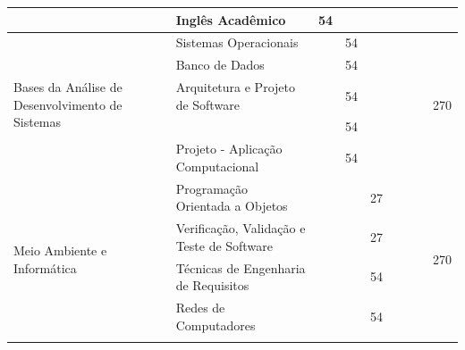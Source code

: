 \documentclass[11pt,fleqn]{book} %
\begin{document}
\begin{table}[]
{\begin{tabular}{|l|l|c|c|c|c|c|c|c|}
			& Inglês Acadêmico                                              & 54              &                 &                 &                 &                 &                 &                      \\ \hline
			\multirow{5}{*}{Bases da Análise de Desenvolvimento de Sistemas} 
			& Sistemas Operacionais                                         &                 & 54              &                 &                 &                 &                 & \multirow{5}{*}{270} \\ \cline{2-8}
			& Banco de Dados                                                &                 & 54              &                 &                 &                 &                 &                      \\ \cline{2-8}
			& Arquitetura e Projeto de Software                             &                 & 54              &                 &                 &                 &                 &                      \\ \cline{2-8}
			& \nameref{disc:estruturadedados}                               &                 & 54              &                 &                 &                 &                 &                      \\ \cline{2-8}
			& Projeto - Aplicação Computacional                             &                 & 54              &                 &                 &                 &                 &                      \\ \hline
			\multirow{7}{*}{Meio Ambiente e Informática}                     
			& Programação Orientada a Objetos                               &                 &                 & 27              &                 &                 &                 & \multirow{7}{*}{270} \\ \cline{2-8}
			& Verificação, Validação e Teste de Software                    &                 &                 & 27              &                 &                 &                 &                      \\ \cline{2-8}
			& Técnicas de Engenharia de Requisitos                          &                 &                 & 54              &                 &                 &                 &                      \\ \cline{2-8}
			& Redes de Computadores                                         &                 &                 & 54              &                 &                 &                 &                      \\ \cline{2-8}

\end{tabular}}
\end{table}
\end{document}
